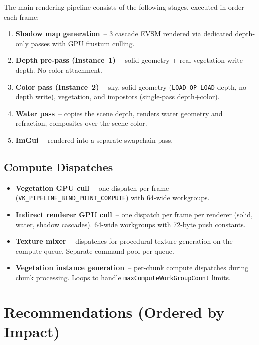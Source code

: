 \documentclass[a4paper,11pt]{article}
\begin{document}
The main rendering pipeline consists of the following stages, executed in
order each frame:

\begin{enumerate}
\item \textbf{Shadow map generation}~-- 3 cascade EVSM rendered via
      dedicated depth-only passes with GPU frustum culling.
\item \textbf{Depth pre-pass (Instance~1)}~-- solid geometry + real
      vegetation write depth. No color attachment.
\item \textbf{Color pass (Instance~2)}~-- sky, solid geometry
      (\texttt{LOAD\_OP\_LOAD} depth, no depth write), vegetation, and
      impostors (single-pass depth+color).
\item \textbf{Water pass}~-- copies the scene depth, renders water
      geometry and refraction, composites over the scene color.
\item \textbf{ImGui}~-- rendered into a separate swapchain pass.
\end{enumerate}

\subsection{Compute Dispatches}

\begin{itemize}
\item \textbf{Vegetation GPU cull}~-- one dispatch per frame
      (\texttt{VK\_PIPELINE\_BIND\_POINT\_COMPUTE}) with 64-wide workgroups.
\item \textbf{Indirect renderer GPU cull}~-- one dispatch per frame per
      renderer (solid, water, shadow cascades). 64-wide workgroups with
      72-byte push constants.
\item \textbf{Texture mixer}~-- dispatches for procedural texture
      generation on the compute queue. Separate command pool per queue.
\item \textbf{Vegetation instance generation}~-- per-chunk compute
      dispatches during chunk processing. Loops to handle
      \texttt{maxComputeWorkGroupCount} limits.
\end{itemize}

\section{Recommendations (Ordered by Impact)}
\end{document}
